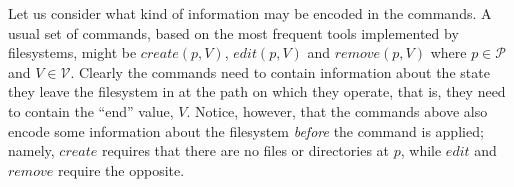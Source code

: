 \documentclass[12pt]{article}
\newcommand{\setv}{\mathcal{V}}
\newcommand{\setp}{\mathcal{P}}
\begin{document}
Let us consider what kind of information may be encoded in the commands.
A usual set of commands, based on the most frequent tools implemented by filesystems,
might be $create(p,V)$, $edit(p,V)$ and $remove(p,V)$ where $p\in\setp$ and $V\in\setv$.
Clearly the commands need to contain information about the state they leave the filesystem
in at the path on which they operate, that is, they need to contain the ``end'' value, $V$.
Notice, however, that the commands above also encode some information about the filesystem
{\it before} the command is applied; namely, $create$ requires that there are no files
or directories at $p$, while $edit$ and $remove$ require the opposite.

\end{document}
